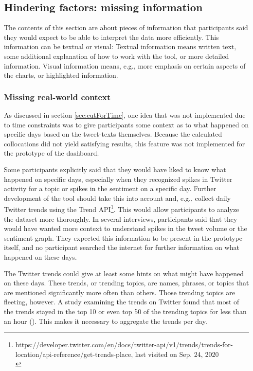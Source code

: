 \subsection{Hindering factors: missing information}
The contents of this section are about pieces of information that participants said they would expect to be able to interpret the data more efficiently. This information can be textual or visual: Textual information means written text, some additional explanation of how to work with the tool, or more detailed information. Visual information means, e.g., more emphasis on certain aspects of the charts, or highlighted information.

\subsubsection*{Missing real-world context}
As discussed in section \ref{sec:cutForTime}, one idea that was not implemented due to time constraints was to give participants some context as to what happened on specific days based on the tweet-texts themselves. Because the calculated collocations did not yield satisfying results, this feature was not implemented for the prototype of the dashboard.

Some participants explicitly said that they would have liked to know what happened on specific days, especially when they recognized spikes in Twitter activity for a topic or spikes in the sentiment on a specific day. Further development of the tool should take this into account and, e.g., collect daily Twitter trends using the Trend API\footnote{https://developer.twitter.com/en/docs/twitter-api/v1/trends/trends-for-location/api-reference/get-trends-place, last visited on Sep. 24, 2020 \\}. This would allow participants to analyze the dataset more thoroughly. In several interviews, participants said that they would have wanted more context to understand spikes in the tweet volume or the sentiment graph. They expected this information to be present in the prototype itself, and no participant searched the internet for further information on what happened on these days.

The Twitter trends could give at least some hints on what might have happened on these days. These trends, or trending topics, are names, phrases, or topics that are mentioned significantly more often than others. Those trending topics are fleeting, however. A study examining the trends on Twitter found that most of the trends stayed in the top 10 or even top 50 of the trending topics for less than an hour (\cite{annamoradnejadComprehensiveAnalysisTwitter2019}). This makes it necessary to aggregate the trends per day.


